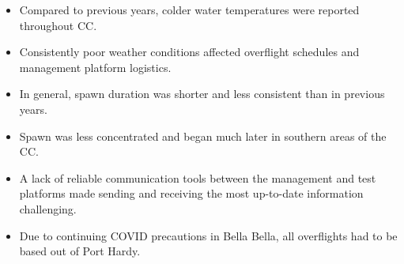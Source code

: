 \begin{itemize}

\item Compared to previous years,
colder water temperatures were reported throughout CC.

\item Consistently poor weather conditions affected overflight schedules and
management platform logistics.

\item In general, spawn duration was shorter and less consistent
than in previous years.

\item Spawn was less concentrated and began much later in southern areas of the CC.

\item A lack of reliable communication tools between
the management and test platforms made sending and receiving
the most up-to-date information challenging.

\item Due to continuing COVID precautions in Bella Bella,
all overflights had to be based out of Port Hardy.

\end{itemize}